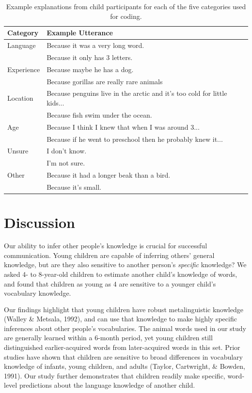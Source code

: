 \documentclass[10pt, letterpaper]{article}
\begin{document}
\begin{table}[tb]
\centering
\begin{tabular}{ll}
  \hline
Category & Example Utterance \\
  \hline
Language & Because it was a very long word. \\
    & Because it only has 3 letters. \\
  Experience & Because maybe he has a dog. \\
    & Because gorillas are really rare animals \\
  Location & Because penguins live in the arctic and it's too cold for little kids... \\
    & Because fish swim under the ocean. \\
  Age & Because I think I knew that when I was around 3... \\
    & Because if he went to preschool then he probably knew it... \\
  Unsure & I don't know. \\
    & I'm not sure. \\
  Other & Because it had a longer beak than a bird. \\
    & Because it's small. \\
   \hline
\end{tabular}
\caption{Example explanations from child participants for each of the five categories used for coding.}
\label{tab:explanations_table}
\end{table}

\hypertarget{discussion}{%
\section{Discussion}\label{discussion}}

Our ability to infer other people's knowledge is crucial for successful
communication. Young children are capable of inferring others' general
knowledge, but are they also sensitive to another person's
\emph{specific} knowledge? We asked 4- to 8-year-old children to
estimate another child's knowledge of words, and found that children as
young as 4 are sensitive to a younger child's vocabulary knowledge.

Our findings highlight that young children have robust metalinguistic
knowledge (Walley \& Metsala, 1992), and can use that knowledge to make
highly specific inferences about other people's vocabularies. The animal
words used in our study are generally learned within a 6-month period,
yet young children still distinguished earlier-acquired words from
later-acquired words in this set. Prior studies have shown that children
are sensitive to broad differences in vocabulary knowledge of infants,
young children, and adults (Taylor, Cartwright, \& Bowden, 1991). Our
study further demonstrates that children readily make specific,
word-level predictions about the language knowledge of another child.
\end{document}
